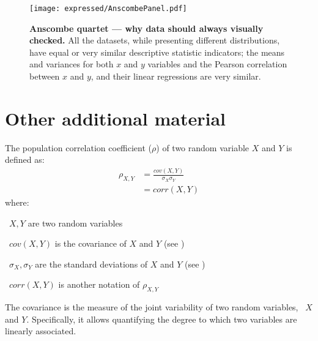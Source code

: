 
\begin{figure}[!ht]
    \texttt{[image: expressed/AnscombePanel.pdf]}\centering
    \caption[Anscombe quartet --- why data should always be visualy checked]
    {\label{fig:Anscombe}\textbf{Anscombe quartet --- why data should always
    visually checked.}\smallbreak{} All the datasets, while presenting
    different distributions, have equal or very similar descriptive statistic
    indicators;
    the means and variances for both $x$ and $y$ variables and
    the Pearson correlation between $x$ and $y$, and
    their linear regressions are very similar.}
\end{figure}


\section{Other additional material}


The population correlation coefficient ($\rho$) of two random variable $X$ and $Y$
is defined as:
\begin{equation}\label{eq:PearsonPopCor}
     \tag{Population correlation coefficient}
     \begin{split}
         \rho_{X,Y} & = \frac{cov(X,Y)}{\sigma_X \sigma_Y}\\
                    & = corr(X,Y)
     \end{split}
\end{equation}
where:
\quad\begin{eqlist}
    \item[\textbullet\ $X,Y$] are two random variables
    \item[\textbullet\ $cov(X,Y)$] is the covariance of $X$ and $Y$
        (see )
    \item[\textbullet\ $\sigma_{X},\sigma_{Y}$] are the standard deviations
        of $X$ and $Y$ (see )
    \item[\textbullet\ $corr(X,Y)$] is another notation of $\rho_{X,Y}$
\end{eqlist}

The covariance is the measure of the joint variability of two random variables,
\eg\ $X$ and $Y$.
Specifically, it allows quantifying the degree to which
two variables are linearly associated.

